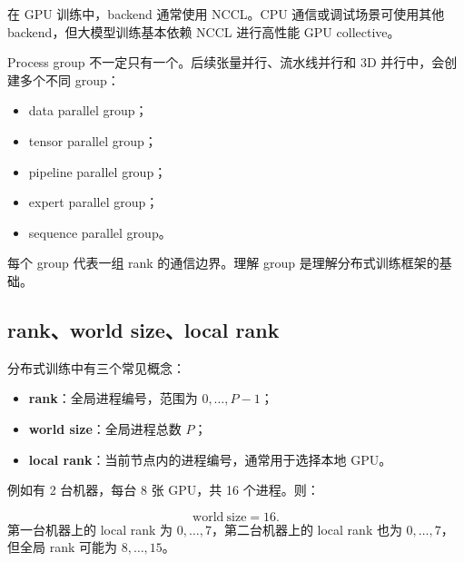 在 GPU 训练中，backend 通常使用 NCCL。CPU 通信或调试场景可使用其他 backend，但大模型训练基本依赖 NCCL 进行高性能 GPU collective。

Process group 不一定只有一个。后续张量并行、流水线并行和 3D 并行中，会创建多个不同 group：

\begin{itemize}
\item data parallel group；
\item tensor parallel group；
\item pipeline parallel group；
\item expert parallel group；
\item sequence parallel group。
\end{itemize}

每个 group 代表一组 rank 的通信边界。理解 group 是理解分布式训练框架的基础。

\subsection{rank、world size、local rank}
\label{subsec:rank-world-size-local-rank}

分布式训练中有三个常见概念：

\begin{itemize}
\item \textbf{rank}：全局进程编号，范围为 $0,\ldots,P-1$；
\item \textbf{world size}：全局进程总数 $P$；
\item \textbf{local rank}：当前节点内的进程编号，通常用于选择本地 GPU。
\end{itemize}

例如有 2 台机器，每台 8 张 GPU，共 16 个进程。则：

\[
\mathrm{world\ size}=16.
\]
第一台机器上的 local rank 为 $0,\ldots,7$，第二台机器上的 local rank 也为 $0,\ldots,7$，但全局 rank 可能为 $8,\ldots,15$。

